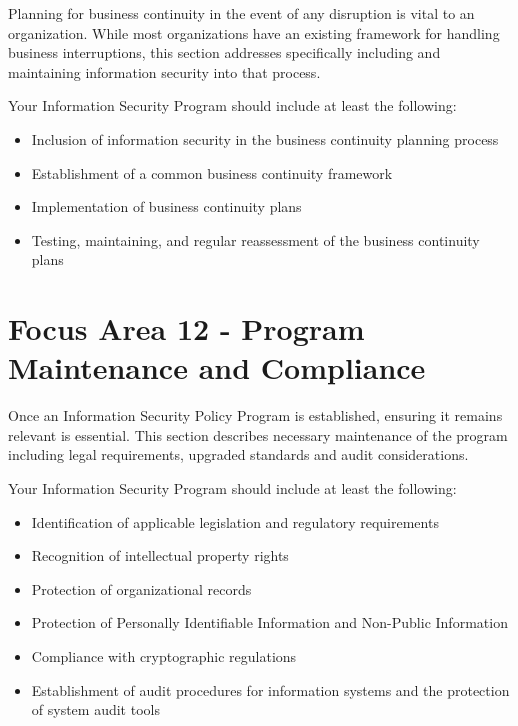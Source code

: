 \documentclass{needs}
\begin{document}
			Planning for business continuity in the event of any disruption is vital to an organization.  While most organizations have an existing framework for handling business interruptions, this section addresses specifically including and maintaining information security into that process.
			
			Your Information Security Program should include at least the following: 
			\begin{itemize}
				\item Inclusion of information security in the business continuity planning process
				\item Establishment of a common business continuity framework
				\item Implementation of business continuity plans
				\item Testing, maintaining, and regular reassessment of the business continuity plans
			\end{itemize}			

			\vspace{20pt}
			\fElevenTable
			
		\section{Focus Area 12 - Program Maintenance and Compliance}
		
			Once an Information Security Policy Program is established, ensuring it remains relevant is essential.  This section describes necessary maintenance of the program including legal requirements, upgraded standards and audit considerations.

			Your Information Security Program should include at least the following: 
			\begin{itemize}
				\item Identification of applicable legislation and regulatory requirements
				\item Recognition of intellectual property rights
				\item Protection of organizational records
				\item Protection of Personally Identifiable Information and Non-Public Information
				\item Compliance with cryptographic regulations
				\item Establishment of audit procedures for information systems and the protection of system audit tools
			\end{itemize}

			\vspace{20pt}
			\fTwelveTable
			
\end{document}
